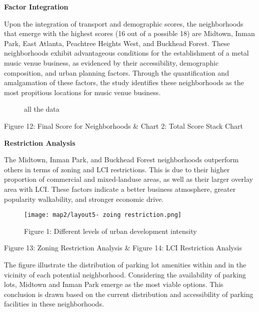 \documentclass[11pt]{article}
\begin{document}
\newpage

\textbf{Factor Integration}

Upon the integration of transport and demographic scores, the neighborhoods that emerge with the highest scores (16 out of a possible 18) are Midtown, Inman Park, East Atlanta, Peachtree Heights West, and Buckhead Forest. These neighborhoods exhibit advantageous conditions for the establishment of a metal music venue business, as evidenced by their accessibility, demographic composition, and urban planning factors. Through the quantification and amalgamation of these factors, the study identifies these neighborhoods as the most propitious locations for music venue business.

\begin{figure}[H] 
    \centering
    \hfill%
    \caption{all the data}
\end{figure}

\begin{center}
\centering
Figure 12: Final Score for Neighborhoods \& Chart 2: Total Score Stack Chart
\end{center}

\newpage
\textbf{Restriction Analysis}

The Midtown, Inman Park, and Buckhead Forest neighborhoods outperform others in terms of zoning and LCI restrictions. This is due to their higher proportion of commercial and mixed-landuse areas, as well as their larger overlay area with LCI. These factors indicate a better business atmosphere, greater popularity walkability, and stronger economic drive.

\begin{figure}[H]
\begin{center}
\centering
\texttt{[image: map2/layout5- zoing restriction.png]}
\caption{Figure 1: Different levels of urban development intensity}
\label{fig:figure1}
\end{center}
\end{figure}

\begin{center}
\centering
Figure 13: Zoning Restriction Analysis \& Figure 14: LCI Restriction Analysis
\end{center}

The figure illustrate the distribution of parking lot amenities within and in the vicinity of each potential neighborhood. Considering the availability of parking lots, Midtown and Inman Park emerge as the most viable options. This conclusion is drawn based on the current distribution and accessibility of parking facilities in these neighborhoods.
\end{document}
